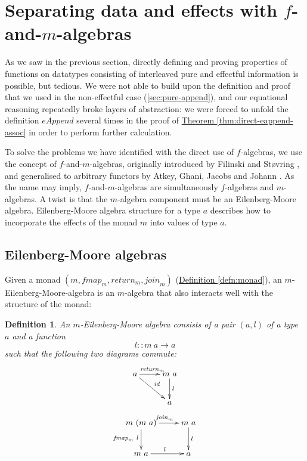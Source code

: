 \documentclass{jfp1}
\newtheorem{definition}{Definition}
\newcommand{\thmref}[1]{\hyperref[#1]{Theorem \ref*{#1}}}
\newcommand{\defref}[1]{\hyperref[#1]{Definition \ref*{#1}}}
\begin{document}
\section{Separating data and effects with \texorpdfstring{$f$}{f}-and-\texorpdfstring{$m$}{m}-algebras}
\label{sec:f-and-m-algebras}

As we saw in the previous section, directly defining and proving
properties of functions on datatypes consisting of interleaved pure
and effectful information is possible, but tedious. We were not able
to build upon the definition and proof that we used in the
non-effectful case (\autoref{sec:pure-append}), and our equational
reasoning repeatedly broke layers of abstraction: we were forced to
unfold the definition $\mathit{eAppend}$ several times in the proof of
\thmref{thm:direct-eappend-assoc} in order to perform further
calculation.

To solve the problems we have identified with the direct use of
$f$-algebras, we use the concept of $f$-and-$m$-algebras, originally
introduced by Filinski and St\o{}vring \cite{filinski07inductive}, and
generalised to arbitrary functors by Atkey, Ghani, Jacobs and Johann
\cite{atkey12fibrational}. As the name may imply, $f$-and-$m$-algebras
are simultaneously $f$-algebras and $m$-algebras. A twist is that the
$m$-algebra component must be an Eilenberg-Moore
algebra. Eilenberg-Moore algebra structure for a type $a$ describes
how to incorporate the effects of the monad $m$ into values of type
$a$.

\subsection{Eilenberg-Moore algebras}
\label{sec:eilenberg-moore-algebras}

Given a monad $(m, \mathit{fmap}_m, \mathit{return}_m,
\mathit{join}_m)$ (\defref{defn:monad}), an
$m$-Eilenberg-Moore-algebra is an $m$-algebra that also interacts well
with the structure of the monad:

\begin{definition}
  An \emph{$m$-Eilenberg-Moore algebra} consists of a pair
  $(a,l)$ of a type $a$ and a function
  \begin{displaymath}
    l :: m~a \to a
  \end{displaymath}
  such that the following two diagrams commute:
  \begin{equation}
    \label{eq:em-alg-return}
    \xymatrix{
      {a} \ar[r]^{\mathit{return}_m} \ar[rd]^{\mathit{id}}
      &
      {m~a} \ar[d]^{l}
      \\
      &
      {a}
    }
  \end{equation}
  \begin{equation}
    \label{eq:em-alg-join}
    \xymatrix{
      {m~(m~a)} \ar[r]^{\mathit{join}_m} \ar[d]_{\mathit{fmap}_m~l}
      &
      {m~a} \ar[d]^{l}
      \\
      {m~a} \ar[r]^l
      &
      {a}
    }
  \end{equation}
\end{definition}
\end{document}
